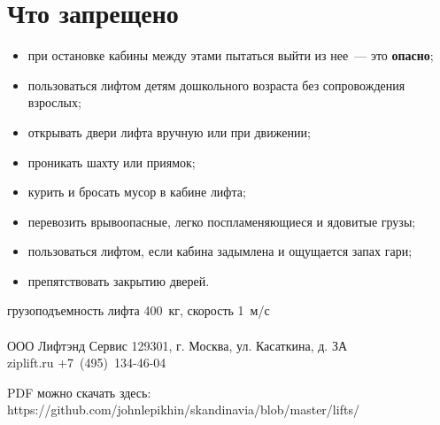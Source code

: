 \documentclass[10pt, a4paper]{article}
\begin{document}
\section*{Что запрещено}

\begin{itemize}
  \item при остановке кабины между этами пытаться выйти из нее~--- это \textbf{опасно};
  \item пользоваться лифтом детям дошкольного возраста без сопровождения взрослых;
  \item открывать двери лифта вручную или при движении;
  \item проникать шахту или приямок;
  \item курить и бросать мусор в кабине лифта;
  \item перевозить врывоопасные, легко поспламеняющиеся и ядовитые грузы;
  \item пользоваться лифтом, если кабина задымлена и ощущается запах гари;
  \item препятствовать закрытию дверей.
\end{itemize}

\small{
  \mbox{}\hfill грузоподъемность лифта 400~кг, скорость 1~м/с\\
  \\
  \mbox{}\hfill ООО Лифтэнд Сервис 129301, г. Москва, ул. Касаткина, д. ЗА\\
  \mbox{}\hfill ziplift.ru +7~(495)~134-46-04
}

\vspace*{\fill}
\tiny{
  \mbox{}\hfill PDF можно скачать здесь: https://github.com/johnlepikhin/skandinavia/blob/master/lifts/
}
\end{document}
